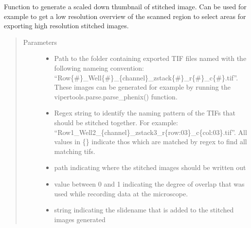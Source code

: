 \documentclass[a4paper,10pt,english,openany,oneside]{sphinxmanual}
\begin{document}
\begin{fulllineitems}
\label{\detokenize{pages/modules:vipertools.stitch.generate_thumbnail}}
\sphinxAtStartPar
Function to generate a scaled down thumbnail of stitched image. Can be used for example to
get a low resolution overview of the scanned region to select areas for exporting high resolution
stitched images.
\begin{quote}\begin{description}
\item[{Parameters}] \leavevmode\begin{itemize}
\item {} 
\sphinxAtStartPar
{} \textendash{} Path to the folder containing exported TIF files named with the following nameing convention: “Row\{\#\}\_Well\{\#\}\_\{channel\}\_zstack\{\#\}\_r\{\#\}\_c\{\#\}.tif”.
These images can be generated for example by running the vipertools.parse.parse\_phenix() function.

\item {} 
\sphinxAtStartPar
{} \textendash{} Regex string to identify the naming pattern of the TIFs that should be stitched together.
For example: “Row1\_Well2\_\{channel\}\_zstack3\_r\{row:03\}\_c\{col:03\}.tif”.
All values in \{\} indicate thos which are matched by regex to find all matching tifs.

\item {} 
\sphinxAtStartPar
{} \textendash{} path indicating where the stitched images should be written out

\item {} 
\sphinxAtStartPar
{} \textendash{} value between 0 and 1 indicating the degree of overlap that was used while recording data at the microscope.

\item {} 
\sphinxAtStartPar
{} \textendash{} string indicating the slidename that is added to the stitched images generated


\end{itemize}
\end{description}
\end{quote}
\end{fulllineitems}
\end{document}
